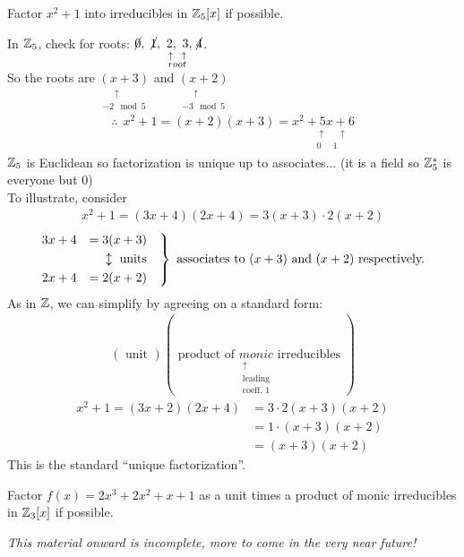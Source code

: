 \begin{example}
    Factor $x^2+1$ into irreducibles in ${\mathbb{ Z}}_5[x]$ if possible. \\ \steezybreak

    In ${\mathbb{ Z}}_5$, check for roots: $\cancel{0}, \ \cancel{1}, \underset{\substack{\uparrow \ \  \uparrow \\ root}}{\ 2, \ 3,} \ \cancel{4}$. \\
    So the roots are $\underset{\substack{\ \ \ \ \ \  \uparrow \\ -2 \mod 5}}{(x+3)}$ and $\underset{\substack{\ \ \ \ \ \  \uparrow \\ -3 \mod 5}}{(x+2)}$
    \begin{align*}
        \therefore \ \ x^2+1 = (x+2)(x+3) = \underset{\substack{\ \ \ \ \ \ \ \ \  \uparrow \ \ \ \ \ \ \uparrow \\ \ \ \ \ \ \ \ \ \  0 \ \ \ \ \ \ 1 }}{x^2 + 5x + 6}
    \end{align*}
    ${\mathbb{ Z}}_5$ is Euclidean so factorization is unique up to associates... (it is a field so ${\mathbb{ Z}}_5^*$ is everyone but $0$) \\ \steezybreak
    To illustrate, consider 
    \begin{align*}
        x^2+1 = (3x+4)(2x+4) = 3(x+3)\cdot 2(x+2)
    \end{align*}
    \begin{align*}
        \begin{rcases}
            3x+4 &= 3(x+3) \ \ \ \\
            & \ \ \ \ \updownarrow \text{ units} \\
            2x+4 &= 2(x+2) \ \ \ 
        \end{rcases}
        \text{ associates to }(x+3) \text{ and }(x+2) \text{ respectively.}
    \end{align*}
    As in ${\mathbb{ Z}}$, we can simplify by agreeing on a standard form:
    \begin{align*}
        (\text{ unit })(\text{ product of }\underset{\substack{\uparrow \\ \text{leading} \\ \text{coeff. 1}}}{monic} \text{ irreducibles })
    \end{align*}
    \begin{align*}
        x^2+1 = (3x+2)(2x+4)&= 3\cdot 2 (x+3)(x+2) \\
        &= 1\cdot (x+3)(x+2) \\
        &=(x+3)(x+2)
    \end{align*}
    This is the standard ``unique factorization''.
\end{example}
\newpage 
\begin{example}
    Factor $f(x)=2x^3+2x^2+x+1$ as a unit times a product of monic irreducibles in ${\mathbb{ Z}}_3[x]$ if possible. \\ \steezybreak
    
\end{example}
\steezybreak \textit{This material onward is incomplete, more to come in the very near future!}
